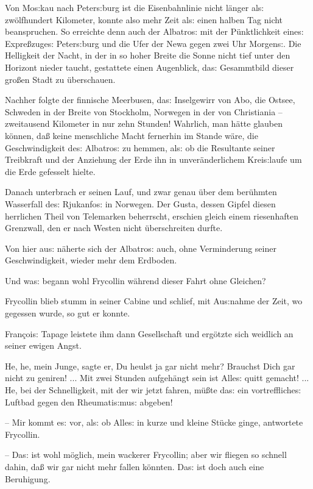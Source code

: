 \documentclass[oneside,12pt]{book}
\newcommand{\s}{s:}
\begin{document}
Von Mo{\s}kau nach Peter{\s}burg ist die Eisenbahnlinie nicht
l\"anger al{\s} zw\"olfhundert Kilometer, konnte also mehr Zeit
al{\s} einen halben Tag nicht beanspruchen. So erreichte denn auch
der {\glqq}Albatro{\s}{\grqq} mit der P\"unktlichkeit eine{\s}
Expre{\ss}zuge{\s} Peter{\s}burg und die Ufer der Newa gegen zwei Uhr
Morgen{\s}. Die Helligkeit der Nacht, in der in so hoher Breite die
Sonne nicht tief unter den Horizont nieder taucht, gestattete einen
Augenblick, da{\s} Gesammtbild dieser gro{\ss}en Stadt zu
\"uberschauen.

Nachher folgte der finnische Meerbusen, da{\s} Inselgewirr von Abo,
die Ostsee, Schweden in der Breite von Stockholm, Norwegen in der von
Christiania -- zweitausend Kilometer in nur zehn Stunden! Wahrlich,
man h\"atte glauben k\"onnen, da{\ss} keine menschliche Macht
fernerhin im Stande w\"are, die Geschwindigkeit de{\s}
{\glqq}Albatro{\s}{\grqq} zu hemmen, al{\s} ob die Resultante seiner
Treibkraft und der Anziehung der Erde ihn in unver\"anderlichem
Krei{\s}laufe um die Erde gefesselt hielte.

Danach unterbrach er seinen Lauf, und zwar genau \"uber dem
ber\"uhmten Wasserfall de{\s} Rjukanfo{\s} in Norwegen. Der Gusta,
dessen Gipfel diesen herrlichen Theil von Telemarken beherrscht,
erschien gleich einem riesenhaften Grenzwall, den er nach Westen
nicht \"uberschreiten durfte.

Von hier au{\s} n\"aherte sich der {\glqq}Albatro{\s}{\grqq} auch,
ohne Verminderung seiner Geschwindigkeit, wieder mehr dem Erdboden.

Und wa{\s} begann wohl Frycollin w\"ahrend dieser Fahrt ohne
Gleichen?

Frycollin blieb stumm in seiner Cabine und schlief, mit Au{\s}nahme
der Zeit, wo gegessen wurde, so gut er konnte.

Fran\c{c}oi{\s} Tapage leistete ihm dann Gesellschaft und erg\"otzte
sich weidlich an seiner ewigen Angst.

{\glqq}He, he, mein Junge, sagte er, Du heulst ja gar nicht mehr?
Brauchst Dich gar nicht zu geniren! ... Mit zwei Stunden aufgeh\"angt
sein ist Alle{\s} quitt gemacht! ... He, bei der Schnelligkeit, mit
der wir jetzt fahren, m\"u{\ss}te da{\s} ein vortreffliche{\s}
Luftbad gegen den Rheumati{\s}mu{\s} abgeben!

-- Mir kommt e{\s} vor, al{\s} ob Alle{\s} in kurze und kleine
St\"ucke ginge, antwortete Frycollin.

-- Da{\s} ist wohl m\"oglich, mein wackerer Frycollin; aber wir
fliegen so schnell dahin, da{\ss} wir gar nicht mehr fallen
k\"onnten. Da{\s} ist doch auch eine Beruhigung.
\end{document}
